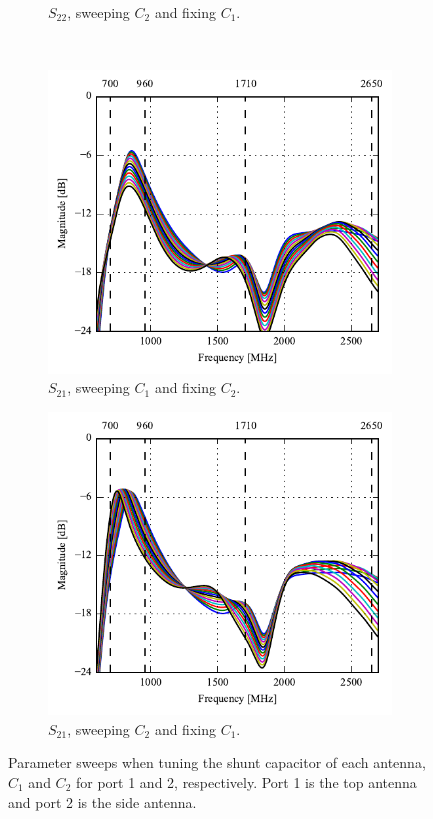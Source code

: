 \begin{figure}[htbp]
\begin{subfigure}{0.49\linewidth}
        \caption{$S_{22}$, sweeping $C_2$ and fixing $C_1$.}
    \end{subfigure}
    \\
    \begin{subfigure}{0.49\linewidth}
        \centering
        \includegraphics{img/tech_sol/trianglefeed/Csh1s21.pdf}
        \caption{$S_{21}$, sweeping $C_1$ and fixing $C_2$.}
    \end{subfigure}
    \hfill
    \begin{subfigure}{0.49\linewidth}
        \centering
        \includegraphics{img/tech_sol/trianglefeed/Csh2s21.pdf}
        \caption{$S_{21}$, sweeping $C_2$ and fixing $C_1$.}
    \end{subfigure}
    \caption{Parameter sweeps when tuning the shunt capacitor of each antenna, $C_{1}$ and $C_{2}$ for port 1 and 2, respectively. Port 1 is the top antenna and port 2 is the side antenna.}
    \label{fig:ant2sweeps}
\end{figure}

